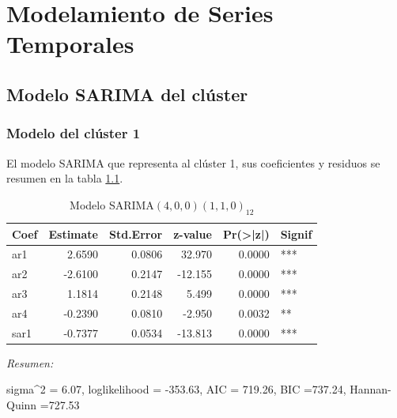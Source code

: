 \documentclass[12pt,oneside]{book}\usepackage[]{graphicx}\usepackage[]{color}
\newenvironment{knitrout}{}{} %
\theoremstyle{definition} %
\begin{document}






\chapter{Modelamiento de Series Temporales}


\section{Modelo SARIMA del clúster}
\label{ap:sarima}







\subsection{Modelo del clúster 1}




El modelo SARIMA que representa al clúster 1, sus coeficientes y residuos se resumen en la tabla \ref{tab:sarima_cl1}.

\begin{knitrout}
\color{fgcolor}\begin{table}

\caption{\label{tab:unnamed-chunk-73}\label{tab:sarima_cl1}Modelo SARIMA$(4,0,0)(1,1,0)_{12}$}
\centering
\begin{threeparttable}
\begin{tabular}[t]{lrrrrl}
\toprule
Coef & Estimate & Std.Error & z-value & Pr(>|z|) & Signif\\
\midrule
\rowcolor{gray!6}  ar1 & 2.6590 & 0.0806 & 32.970 & 0.0000 & ***\\
ar2 & -2.6100 & 0.2147 & -12.155 & 0.0000 & ***\\
\rowcolor{gray!6}  ar3 & 1.1814 & 0.2148 & 5.499 & 0.0000 & ***\\
ar4 & -0.2390 & 0.0810 & -2.950 & 0.0032 & **\\
\rowcolor{gray!6}  sar1 & -0.7377 & 0.0534 & -13.813 & 0.0000 & ***\\
\bottomrule
\end{tabular}
\begin{tablenotes}
\item \textit{Resumen:} 
\item sigma\textasciicircum{}2 = 6.07, loglikelihood = -353.63, AIC = 719.26, BIC =737.24, Hannan-Quinn =727.53
\end{tablenotes}
\end{threeparttable}
\end{table}


\end{knitrout}
\end{document}
